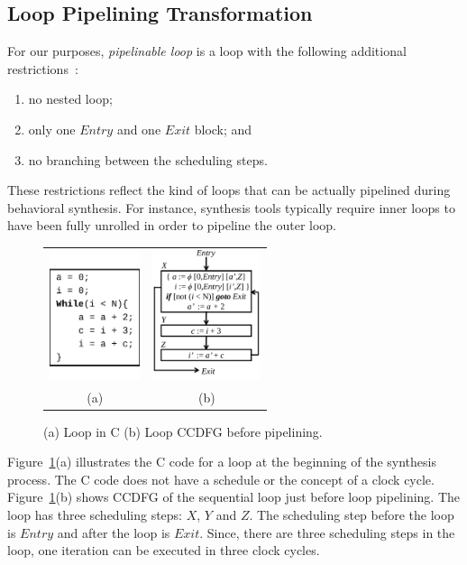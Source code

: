 \subsection{Loop Pipelining Transformation}
\label{subsec:loop-pipelining-trans}
For our purposes,
{\em pipelinable loop} is a loop with the following additional restrictions~\cite{hrx:dac-12}:
\begin{enumerate}
\item no nested loop;
\item only one $Entry$ and one $Exit$ block; and
\item no branching between the scheduling steps.
\end{enumerate}
These restrictions reflect the kind of loops that can be
actually pipelined during behavioral synthesis. For
instance, synthesis tools typically require inner loops to
have been fully unrolled  in order to pipeline the outer loop.


\begin{figure}[H]%
\begin{center}
\begin{tabular}{cc}
\includegraphics[height=1.5in]{fig-rpe/C-code}
& \hspace{2cm}
\includegraphics[height=1.5in]{fig-rpe/seq-ccdfg}
\\
(a) & \hspace{2cm} (b) 
\end{tabular}
\end{center}
\caption{(a) Loop in C (b) Loop CCDFG before pipelining.}
\label{fig:high-level-synthesis}
\end{figure}

Figure~\ref{fig:high-level-synthesis}(a) illustrates the C
code for a loop at the beginning of the
synthesis process. The C code does not have a schedule or the
concept of a clock cycle. Figure~\ref{fig:high-level-synthesis}(b)
shows CCDFG of the sequential loop just before loop pipelining. The loop has three scheduling steps: $X$, $Y$ and $Z$.  The scheduling step before the loop is $Entry$ and after the loop is $Exit$. Since,
there are three scheduling steps in the loop, one iteration
can be executed in three clock cycles.

